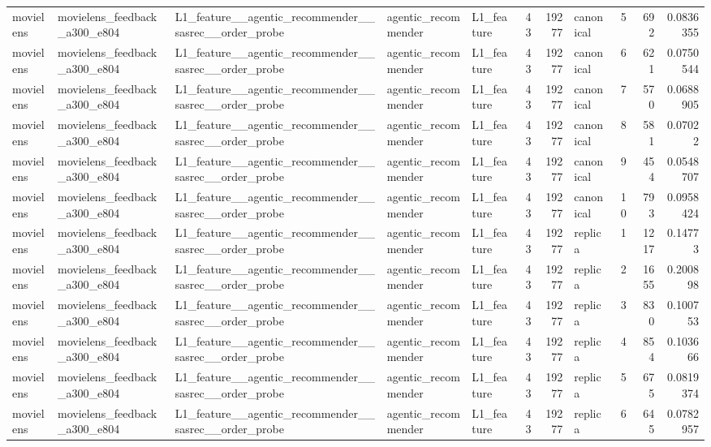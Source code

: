 \begin{table}[htbp!]
\begin{tabular}{lllllrrlrrr}
movielens & movielens\_feedback\_a300\_e804 & L1\_feature\_\_agentic\_recommender\_\_sasrec\_\_order\_probe & agentic\_recommender & L1\_feature & 43 & 19277 & canonical & 5 & 692 & 0.0836355 \\
movielens & movielens\_feedback\_a300\_e804 & L1\_feature\_\_agentic\_recommender\_\_sasrec\_\_order\_probe & agentic\_recommender & L1\_feature & 43 & 19277 & canonical & 6 & 621 & 0.0750544 \\
movielens & movielens\_feedback\_a300\_e804 & L1\_feature\_\_agentic\_recommender\_\_sasrec\_\_order\_probe & agentic\_recommender & L1\_feature & 43 & 19277 & canonical & 7 & 570 & 0.0688905 \\
movielens & movielens\_feedback\_a300\_e804 & L1\_feature\_\_agentic\_recommender\_\_sasrec\_\_order\_probe & agentic\_recommender & L1\_feature & 43 & 19277 & canonical & 8 & 581 & 0.07022 \\
movielens & movielens\_feedback\_a300\_e804 & L1\_feature\_\_agentic\_recommender\_\_sasrec\_\_order\_probe & agentic\_recommender & L1\_feature & 43 & 19277 & canonical & 9 & 454 & 0.0548707 \\
movielens & movielens\_feedback\_a300\_e804 & L1\_feature\_\_agentic\_recommender\_\_sasrec\_\_order\_probe & agentic\_recommender & L1\_feature & 43 & 19277 & canonical & 10 & 793 & 0.0958424 \\
movielens & movielens\_feedback\_a300\_e804 & L1\_feature\_\_agentic\_recommender\_\_sasrec\_\_order\_probe & agentic\_recommender & L1\_feature & 43 & 19277 & replica & 1 & 1217 & 0.14773 \\
movielens & movielens\_feedback\_a300\_e804 & L1\_feature\_\_agentic\_recommender\_\_sasrec\_\_order\_probe & agentic\_recommender & L1\_feature & 43 & 19277 & replica & 2 & 1655 & 0.200898 \\
movielens & movielens\_feedback\_a300\_e804 & L1\_feature\_\_agentic\_recommender\_\_sasrec\_\_order\_probe & agentic\_recommender & L1\_feature & 43 & 19277 & replica & 3 & 830 & 0.100753 \\
movielens & movielens\_feedback\_a300\_e804 & L1\_feature\_\_agentic\_recommender\_\_sasrec\_\_order\_probe & agentic\_recommender & L1\_feature & 43 & 19277 & replica & 4 & 854 & 0.103666 \\
movielens & movielens\_feedback\_a300\_e804 & L1\_feature\_\_agentic\_recommender\_\_sasrec\_\_order\_probe & agentic\_recommender & L1\_feature & 43 & 19277 & replica & 5 & 675 & 0.0819374 \\
movielens & movielens\_feedback\_a300\_e804 & L1\_feature\_\_agentic\_recommender\_\_sasrec\_\_order\_probe & agentic\_recommender & L1\_feature & 43 & 19277 & replica & 6 & 645 & 0.0782957 \\

\end{tabular}
\end{table}
